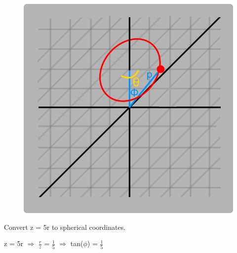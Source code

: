     \begin{figure}[h]
        \centering
        \includegraphics[scale=0.3]{Images/1.6.3.png}
    \end{figure}



    \begin{example}
        Convert z = 5r to spherical coordinates.
    \end{example}

    \begin{tbox}
        z = 5r
        \hspace{0.5cm}
        $\Rightarrow$
        \hspace{0.5cm}
        $\frac{r}{z}$ = $\frac{1}{5}$
        \hspace{0.5cm}
        $\Rightarrow$
        \hspace{0.5cm}
        tan($\phi$) = $\frac{1}{5}$
    \end{tbox}




